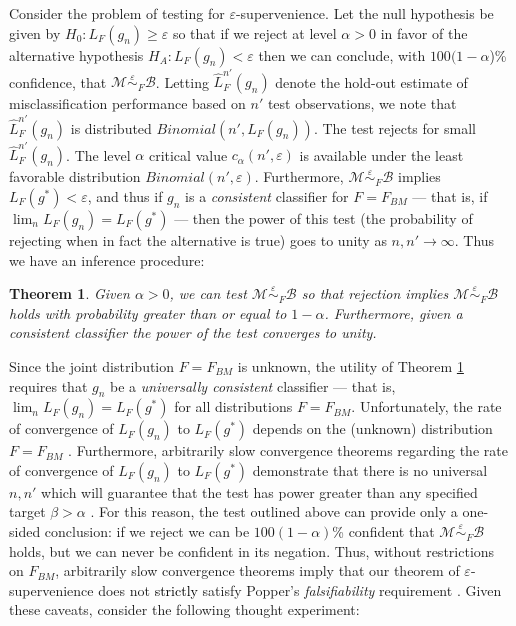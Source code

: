 \documentclass{article}
\newcommand{\mB}{\mathcal{B}}
\newcommand{\mM}{\mathcal{M}}
\newcommand{\hL}{\widehat{L}}
\newcommand{\MeB}{\mM \overset{\varepsilon}{{\sim}}_F \mB}
\providecommand{\tr}[1]{\textcolor{black}{#1}}
\newtheorem{thm}{Theorem}
\begin{document}
Consider the problem of testing for $\varepsilon$-supervenience. Let the null hypothesis be given by $H_0: L_{F}(g_n) \geq \varepsilon$ so that if we reject at level $\alpha >0$ in favor of the alternative hypothesis $H_A: L_{F}(g_n) < \varepsilon$ then we can conclude, with $100(1-\alpha$)\% confidence, that $\MeB$. Letting $\hL^{n'}_{F}(g_n)$ denote the hold-out estimate of misclassification performance based on $n'$ test observations, we note that $\hL^{n'}_{F}(g_n)$ is distributed $Binomial(n',L_{F}(g_n))$. The test rejects for small $\hL^{n'}_{F}(g_n)$. The level $\alpha$ critical value $c_{\alpha}(n',\varepsilon)$ is available under the least favorable distribution $Binomial(n',\varepsilon)$. Furthermore, $\MeB$ implies $L_{F}(g^*) < \varepsilon$, and thus if $g_n$ is a {\it consistent} classifier for $F=F_{BM}$ --- that is, if $\lim_n L_{F}(g_n) = L_{F}(g^*)$ --- then the power of this test (the probability of rejecting when in fact the alternative is true) goes to unity as $n,n' \rightarrow \infty$. Thus we have an inference procedure: \begin{thm} \label{thm1} Given $\alpha > 0$, we can test $\MeB$ so that rejection implies $\MeB$ holds with probability greater than or equal to $1-\alpha$. Furthermore, given a consistent classifier the power of the test converges to unity. \end{thm}

Since the joint distribution $F=F_{BM}$ is unknown, the utility of Theorem \ref{thm1} requires that $g_n$ be a {\it universally consistent} classifier --- that is, $\lim_n L_{F}(g_n) = L_{F}(g^*)$ for all distributions $F=F_{BM}$. Unfortunately, the rate of convergence of $L_{F}(g_n)$ to $L_{F}(g^*)$ depends on the (unknown) distribution $F=F_{BM}$ \cite{DGL96}. Furthermore, arbitrarily slow convergence theorems regarding the rate of convergence of $L_{F}(g_n)$ to $L_{F}(g^*)$ demonstrate that there is no universal $n,n'$ which will guarantee that the test has power greater than any specified target $\beta > \alpha$ \cite{Devroye83}. For this reason, the test outlined above can provide only a one-sided conclusion: if we reject we can be $100(1-\alpha)$\% confident that $\MeB$ holds, but we can never be confident in its negation. Thus, without restrictions on $F_{BM}$, arbitrarily slow convergence theorems imply that our theorem of $\varepsilon$-supervenience does not \tr{strictly} satisfy Popper's {\it falsifiability} requirement \cite{Popper}. Given these caveats, consider the following thought experiment:
\end{document}
